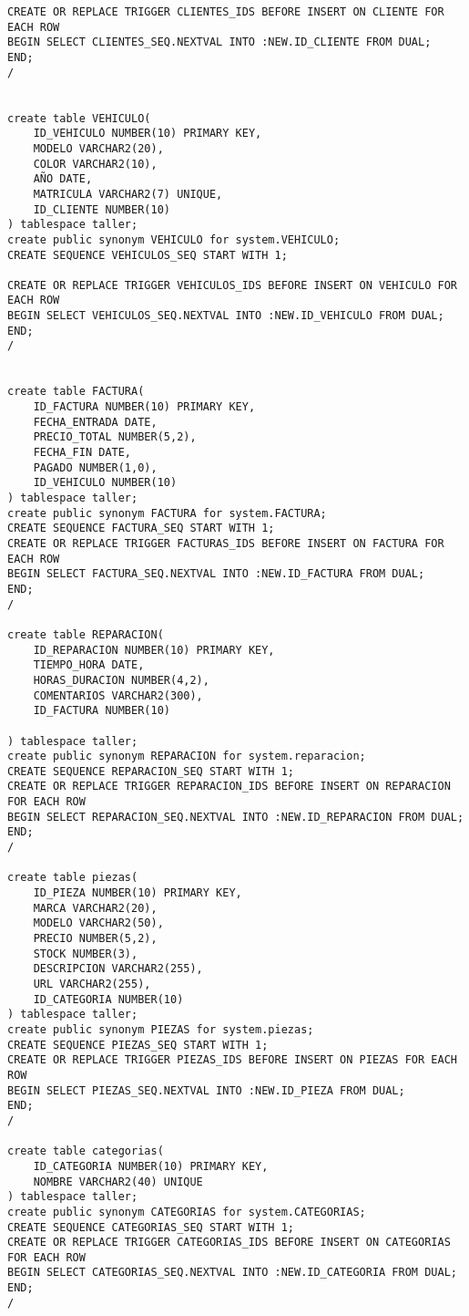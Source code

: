 \begin{lstlisting}[caption=Script .sql para crear la BD.]
CREATE OR REPLACE TRIGGER CLIENTES_IDS BEFORE INSERT ON CLIENTE FOR EACH ROW
BEGIN SELECT CLIENTES_SEQ.NEXTVAL INTO :NEW.ID_CLIENTE FROM DUAL;
END;
/


create table VEHICULO(
    ID_VEHICULO NUMBER(10) PRIMARY KEY,
    MODELO VARCHAR2(20),
    COLOR VARCHAR2(10),
    AÑO DATE,
    MATRICULA VARCHAR2(7) UNIQUE,
    ID_CLIENTE NUMBER(10)
) tablespace taller;
create public synonym VEHICULO for system.VEHICULO;
CREATE SEQUENCE VEHICULOS_SEQ START WITH 1;

CREATE OR REPLACE TRIGGER VEHICULOS_IDS BEFORE INSERT ON VEHICULO FOR EACH ROW
BEGIN SELECT VEHICULOS_SEQ.NEXTVAL INTO :NEW.ID_VEHICULO FROM DUAL;
END;
/


create table FACTURA(
    ID_FACTURA NUMBER(10) PRIMARY KEY,
    FECHA_ENTRADA DATE,
    PRECIO_TOTAL NUMBER(5,2),
    FECHA_FIN DATE,
    PAGADO NUMBER(1,0),
    ID_VEHICULO NUMBER(10)
) tablespace taller;
create public synonym FACTURA for system.FACTURA;
CREATE SEQUENCE FACTURA_SEQ START WITH 1;
CREATE OR REPLACE TRIGGER FACTURAS_IDS BEFORE INSERT ON FACTURA FOR EACH ROW
BEGIN SELECT FACTURA_SEQ.NEXTVAL INTO :NEW.ID_FACTURA FROM DUAL;
END;
/

create table REPARACION(
    ID_REPARACION NUMBER(10) PRIMARY KEY,
    TIEMPO_HORA DATE,
    HORAS_DURACION NUMBER(4,2),
    COMENTARIOS VARCHAR2(300),
    ID_FACTURA NUMBER(10)

) tablespace taller;
create public synonym REPARACION for system.reparacion;
CREATE SEQUENCE REPARACION_SEQ START WITH 1;
CREATE OR REPLACE TRIGGER REPARACION_IDS BEFORE INSERT ON REPARACION FOR EACH ROW
BEGIN SELECT REPARACION_SEQ.NEXTVAL INTO :NEW.ID_REPARACION FROM DUAL;
END;
/

create table piezas(
    ID_PIEZA NUMBER(10) PRIMARY KEY,
    MARCA VARCHAR2(20),
    MODELO VARCHAR2(50),
    PRECIO NUMBER(5,2),
    STOCK NUMBER(3),
    DESCRIPCION VARCHAR2(255),
    URL VARCHAR2(255),
    ID_CATEGORIA NUMBER(10)
) tablespace taller;
create public synonym PIEZAS for system.piezas;
CREATE SEQUENCE PIEZAS_SEQ START WITH 1;
CREATE OR REPLACE TRIGGER PIEZAS_IDS BEFORE INSERT ON PIEZAS FOR EACH ROW
BEGIN SELECT PIEZAS_SEQ.NEXTVAL INTO :NEW.ID_PIEZA FROM DUAL;
END;
/

create table categorias(
    ID_CATEGORIA NUMBER(10) PRIMARY KEY,
    NOMBRE VARCHAR2(40) UNIQUE
) tablespace taller;
create public synonym CATEGORIAS for system.CATEGORIAS;
CREATE SEQUENCE CATEGORIAS_SEQ START WITH 1;
CREATE OR REPLACE TRIGGER CATEGORIAS_IDS BEFORE INSERT ON CATEGORIAS FOR EACH ROW
BEGIN SELECT CATEGORIAS_SEQ.NEXTVAL INTO :NEW.ID_CATEGORIA FROM DUAL;
END;
/


\end{lstlisting}
